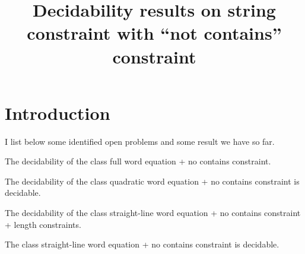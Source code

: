 \documentclass{llncs}
\title{Decidability results on string constraint with ``not contains'' constraint}
\author{}
\institute{}
\begin{document}

\maketitle


\section{Introduction} \label{section:introduction}
I list below some identified open problems and some result we have so far.


\begin{open}
	The decidability of the class full word equation + no contains constraint.
\end{open}

\begin{open}
	The decidability of the class quadratic word equation + no contains constraint is decidable.
\end{open}

\begin{open}
	The decidability of the class straight-line word equation + no contains constraint + length constraints.
\end{open}


\begin{lemma}
The class straight-line word equation + no contains constraint is decidable.
\end{lemma}
\end{document}
